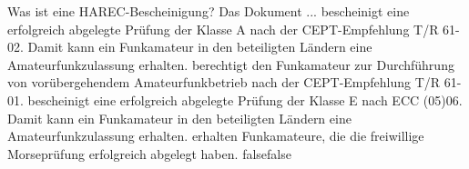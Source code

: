     {Was ist eine HAREC-Bescheinigung? Das Dokument ...}
    {bescheinigt eine erfolgreich abgelegte Prüfung der Klasse A nach der CEPT-Empfehlung T/R 61-02. Damit kann ein Funkamateur in den beteiligten Ländern eine Amateurfunkzulassung erhalten.}
    {berechtigt den Funkamateur zur Durchführung von vorübergehendem Amateurfunkbetrieb nach der CEPT-Empfehlung T/R 61-01.}
    {bescheinigt eine erfolgreich abgelegte Prüfung der Klasse E nach ECC (05)06. Damit kann ein Funkamateur in den beteiligten Ländern eine Amateurfunkzulassung erhalten.}
    {erhalten Funkamateure, die die freiwillige Morseprüfung erfolgreich abgelegt haben.}
    {false}{false}